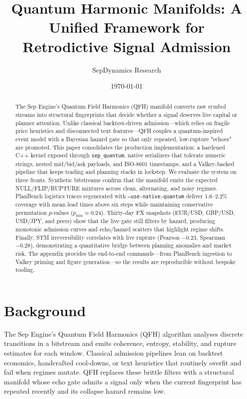 \documentclass[11pt]{article}
\title{Quantum Harmonic Manifolds: A Unified Framework for Retrodictive Signal Admission}
\author{SepDynamics Research}
\date{\today}
\begin{document}
\maketitle

\begin{abstract}
The Sep Engine's Quantum Field Harmonics (QFH) manifold converts raw symbol streams into structural fingerprints that decide whether a signal deserves live capital or planner attention. Unlike classical backtest-driven admission---which relies on fragile price heuristics and disconnected text features---QFH couples a quantum-inspired event model with a Bayesian hazard gate so that only repeated, low-rupture "echoes" are promoted. This paper consolidates the production implementation: a hardened C++ kernel exposed through \texttt{sep\_quantum}, native serializers that tolerate numeric strings, nested mid/bid/ask payloads, and ISO-8601 timestamps, and a Valkey-backed pipeline that keeps trading and planning stacks in lockstep. We evaluate the system on three fronts. Synthetic bitstreams confirm that the manifold emits the expected NULL/FLIP/RUPTURE mixtures across clean, alternating, and noisy regimes. PlanBench logistics traces regenerated with \texttt{--use-native-quantum} deliver 1.6--2.2\% coverage with mean lead times above six steps while maintaining conservative permutation $p$-values (\(p_{\min}\approx0.24\)). Thirty-day FX snapshots (EUR/USD, GBP/USD, USD/JPY, and peers) show that the live gate still filters by hazard, producing monotonic admission curves and echo/hazard scatters that highlight regime shifts. Finally, STM irreversibility correlates with live rupture (Pearson \(-0.23\), Spearman \(-0.28\)), demonstrating a quantitative bridge between planning anomalies and market risk. The appendix provides the end-to-end commands---from PlanBench ingestion to Valkey priming and figure generation---so the results are reproducible without bespoke tooling.
\end{abstract}

\section{Background}
The Sep Engine's Quantum Field Harmonics (QFH) algorithm analyses discrete transitions in a bitstream and emits coherence, entropy, stability, and rupture estimates for each window. Classical admission pipelines lean on backtest economics, handcrafted cool-downs, or text heuristics that routinely overfit and fail when regimes mutate. QFH replaces these brittle filters with a structural manifold whose echo gate admits a signal only when the current fingerprint has repeated recently and its collapse hazard remains low.
\end{document}
